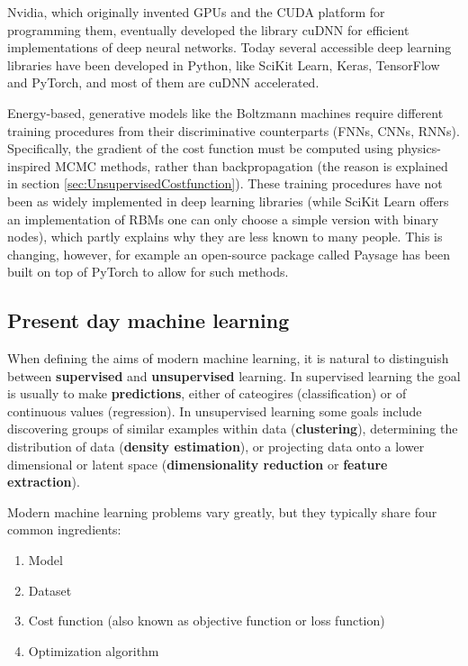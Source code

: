 \documentclass[twoside,english]{uiofysmaster}
\begin{document}
Nvidia, which originally invented GPUs and the CUDA platform for programming them, eventually developed the library cuDNN for efficient implementations of deep neural networks. Today several accessible deep learning libraries have been developed in Python, like SciKit Learn, Keras, TensorFlow and PyTorch, and most of them are cuDNN accelerated. 

Energy-based, generative models like the Boltzmann machines require different training procedures from their discriminative counterparts (FNNs, CNNs, RNNs). Specifically, the gradient of the cost function must be computed using physics-inspired MCMC methods, rather than backpropagation (the reason is explained in section \ref{sec:UnsupervisedCostfunction}). These training procedures have not been as widely implemented in deep learning libraries (while SciKit Learn offers an implementation of RBMs one can only choose a simple version with binary nodes), which partly explains why they are less known to many people. This is changing, however, for example an open-source package called Paysage has been built on top of PyTorch to allow for such methods. 


\subsection{Present day machine learning}
When defining the aims of modern machine learning, it is natural to distinguish between \textbf{supervised} and \textbf{unsupervised} learning. In supervised learning the goal is usually to make \textbf{predictions}, either of cateogires (classification) or of continuous values (regression). In unsupervised learning some goals include discovering groups of similar examples within data (\textbf{clustering}), determining the distribution of data (\textbf{density estimation}), or projecting data onto a lower dimensional or latent space (\textbf{dimensionality reduction} or \textbf{feature extraction}). %

Modern machine learning problems vary greatly, but they typically share four common ingredients:
\begin{enumerate}
	\item Model
	\item Dataset
	\item Cost function (also known as objective function or loss function)
	\item Optimization algorithm
\end{enumerate}
\end{document}
